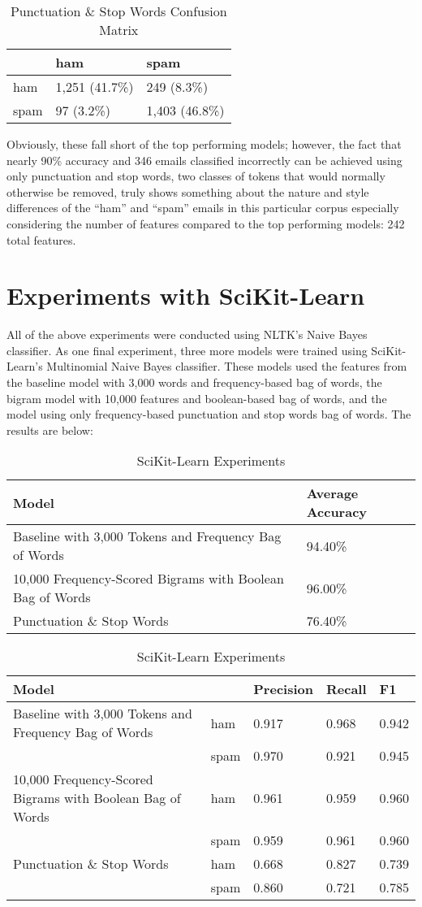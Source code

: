 \documentclass[a4paper]{article}
\begin{document}
	\begin{table}[H]
		\centering
		\caption{Punctuation \& Stop Words Confusion Matrix}
		\begin{tabular}{l|ll}
			& ham & spam \\
			\hline
			ham & 1,251 (41.7\%) & 249 (8.3\%) \\
			spam & 97 (3.2\%) & 1,403 (46.8\%)
		\end{tabular}
	\end{table}

	Obviously, these fall short of the top performing models; however, the fact that nearly 90\% accuracy and 346 emails classified incorrectly can be achieved using only punctuation and stop words, two classes of tokens that would normally otherwise be removed, truly shows something about the nature and style differences of the “ham” and “spam” emails in this particular corpus especially considering the number of features compared to the top performing models: 242 total features.
	
	\section{Experiments with SciKit-Learn}
	
	All of the above experiments were conducted using NLTK's Naive Bayes classifier. As one final experiment, three more models were trained using SciKit-Learn's Multinomial Naive Bayes classifier. These models used the features from the baseline model with 3,000 words and frequency-based bag of words, the bigram model with 10,000 features and boolean-based bag of words, and the model using only frequency-based punctuation and stop words bag of words. The results are below:
	
	\begin{table}[H]
		\centering
		\caption{SciKit-Learn Experiments}
		\begin{tabular}{ll}
			Model & Average Accuracy \\
			\hline
			Baseline with 3,000 Tokens and Frequency Bag of Words & 94.40\% \\
			10,000 Frequency-Scored Bigrams with Boolean Bag of Words & 96.00\% \\
			Punctuation \& Stop Words & 76.40\%
		\end{tabular}
		\begin{tabular}{l|llll}
			\hline
			\hline
			Model & & Precision & Recall & F1 \\
			\hline
			Baseline with 3,000 Tokens and Frequency Bag of Words & ham  & 0.917 & 0.968 & 0.942 \\
			& spam & 0.970 & 0.921 & 0.945 \\
			\hline
			10,000 Frequency-Scored Bigrams with Boolean Bag of Words & ham  & 0.961 & 0.959 & 0.960 \\
			& spam & 0.959 & 0.961 & 0.960 \\
			\hline
			Punctuation \& Stop Words & ham  & 0.668 & 0.827 & 0.739 \\
			& spam & 0.860 & 0.721 & 0.785
		\end{tabular}
	\end{table}
\end{document}
